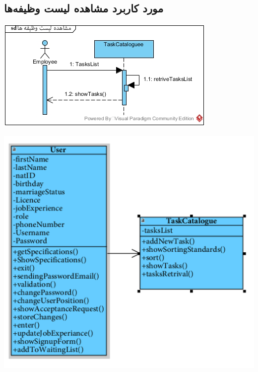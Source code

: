 \newpage
\vspace{2cm}
\subsection*{مورد کاربرد مشاهده لیست وظیفه‌ها}
\vspace{2cm}
\begin{center}
\includegraphics[width=\textwidth]{SequenceDiagrams/29.jpg}
\end{center}

\newpage
\vspace{2cm}
\begin{center}
\includegraphics[width=\textwidth]{SequenceClasses/29.png}
\end{center}

\newpage
\vspace{2cm}
